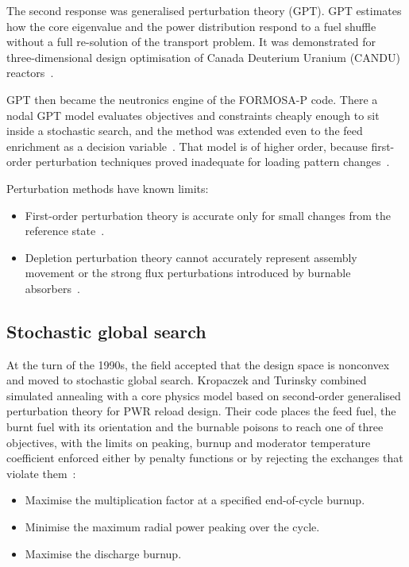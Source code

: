 The second response was generalised perturbation theory (GPT). GPT
estimates how the core eigenvalue and the power distribution respond to
a fuel shuffle without a full re-solution of the transport problem. It
was demonstrated for three-dimensional design optimisation of Canada
Deuterium Uranium (CANDU) reactors~\cite{rozon_beaudet_1992}.

GPT then became the neutronics engine of the FORMOSA-P code. There a
nodal GPT model evaluates objectives and constraints cheaply enough to
sit inside a stochastic search, and the method was extended even to the
feed enrichment as a decision variable~\cite{maldonado_1995}. That model
is of higher order, because first-order perturbation techniques proved
inadequate for loading pattern changes~\cite{maldonado_1995}.

Perturbation methods have known limits:

\begin{itemize}
  \item First-order perturbation theory is accurate only for small
        changes from the reference state~\cite{hobson_turinsky_1986}.

  \item Depletion perturbation theory cannot accurately represent
        assembly movement or the strong flux perturbations introduced
        by burnable absorbers~\cite{downar_1988}.
\end{itemize}

\subsection{Stochastic global search}
\label{sec:lit-opt-stochastic}

At the turn of the 1990s, the field accepted that the design space is
nonconvex and moved to stochastic global search. Kropaczek and Turinsky combined simulated annealing with a core physics
model based on second-order generalised perturbation theory for PWR
reload design. Their code places the feed fuel, the burnt fuel with its
orientation and the burnable poisons to reach one of three objectives,
with the limits on peaking, burnup and moderator temperature coefficient
enforced either by penalty functions or by rejecting the exchanges that
violate them~\cite{kropaczek_turinsky_1991}:

\begin{itemize}
  \item Maximise the multiplication factor at a specified end-of-cycle
        burnup.

  \item Minimise the maximum radial power peaking over the cycle.

  \item Maximise the discharge burnup.
\end{itemize}

